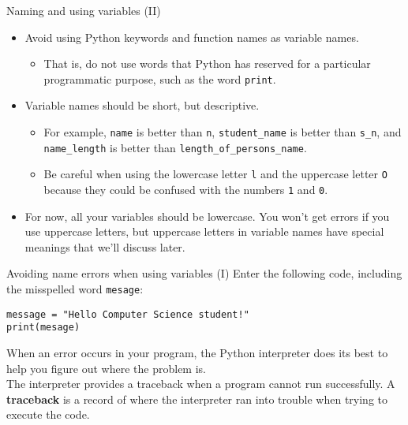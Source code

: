 \documentclass[aspectratio=169]{beamer}
\begin{document}
\begin{frame}{Naming and using variables (II)}
    \begin{itemize}[label=--]
        \item Avoid using Python keywords and function names as variable names.
            \begin{itemize}[label=\(\blacktriangleright\),itemsep=5pt]
                \item That is, do not use words that Python has reserved for a particular programmatic purpose, such as the word \texttt{print}.
            \end{itemize}
        \item Variable names should be short, but descriptive.
            \begin{itemize}[label=\(\blacktriangleright\),itemsep=5pt]
                \item For example, \texttt{name} is better than \texttt{n}, \texttt{student\_name} is better than \texttt{s\_n}, and \texttt{name\_length} is better than \texttt{length\_of\_persons\_name}.
                \item Be careful when using the lowercase letter \texttt{l} and the uppercase letter \texttt{O} because they could be confused with the numbers \texttt{1} and \texttt{0}.
            \end{itemize}
        \item For now, all your variables should be lowercase.
            You won't get errors if you use uppercase letters, but uppercase letters in variable names have special meanings that we'll discuss later.
    \end{itemize}
\end{frame}


\begin{frame}[fragile]{Avoiding name errors when using variables (I)}
    Enter the following code, including the misspelled word \texttt{mesage}:
    \vspace{10pt}
    \begin{Verbatim}
message = "Hello Computer Science student!"
print(mesage)
    \end{Verbatim}
    \vspace{10pt}
    When an error occurs in your program, the Python interpreter does its best to help you figure out where the problem is. \\
    \vspace{10pt}
    The interpreter provides a traceback when a program cannot run successfully.
    A \textbf{traceback} is a record of where the interpreter ran into trouble when trying to execute the code.
\end{frame}
\end{document}
